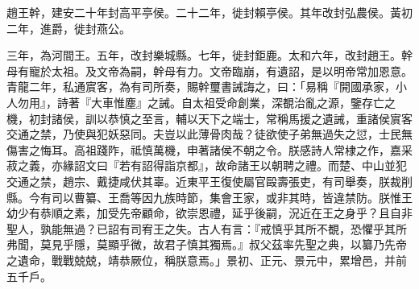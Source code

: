 \begin{pinyinscope}
 
 
 趙王幹，建安二十年封高平亭侯。二十二年，徙封賴亭侯。其年改封弘農侯。黃初二年，進爵，徙封燕公。
 
 
 三年，為河間王。五年，改封樂城縣。七年，徙封鉅鹿。太和六年，改封趙王。幹母有寵於太祖。及文帝為嗣，幹母有力。文帝臨崩，有遺詔，是以明帝常加恩意。青龍二年，私通賔客，為有司所奏，賜幹璽書誡誨之，曰：「易稱『開國承家，小人勿用』，詩著『大車惟塵』之誡。自太祖受命創業，深覩治亂之源，鑒存亡之機，初封諸侯，訓以恭慎之至言，輔以天下之端士，常稱馬援之遺誡，重諸侯賔客交通之禁，乃使與犯妖惡同。夫豈以此薄骨肉哉？徒欲使子弟無過失之愆，士民無傷害之悔耳。高祖踐阼，祗慎萬機，申著諸侯不朝之令。朕感詩人常棣之作，嘉采菽之義，亦緣詔文曰『若有詔得詣京都』，故命諸王以朝聘之禮。而楚、中山並犯交通之禁，趙宗、戴捷咸伏其辜。近東平王復使屬官毆壽張吏，有司舉奏，朕裁削縣。今有司以曹纂、王喬等因九族時節，集會王家，或非其時，皆違禁防。朕惟王幼少有恭順之素，加受先帝顧命，欲崇恩禮，延乎後嗣，況近在王之身乎？且自非聖人，孰能無過？已詔有司宥王之失。古人有言：『戒慎乎其所不覩，恐懼乎其所弗聞，莫見乎隱，莫顯乎微，故君子慎其獨焉。』叔父茲率先聖之典，以纂乃先帝之遺命，戰戰兢兢，靖恭厥位，稱朕意焉。」景初、正元、景元中，累增邑，并前五千戶。
 
 
\end{pinyinscope}